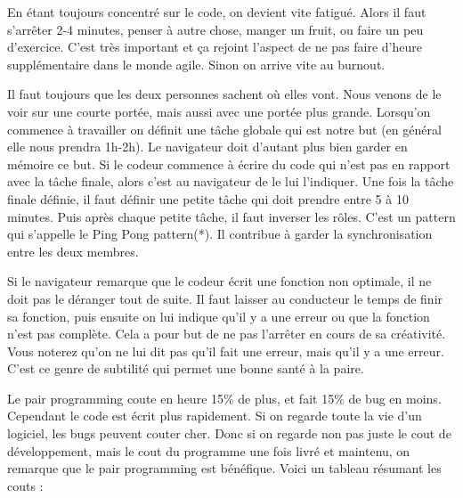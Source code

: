 \documentclass[journal, a4paper, frenchb]{IEEEtran}
\begin{document}
En étant toujours concentré sur le code, on devient vite fatigué. Alors il  faut s’arrêter 2-4 minutes, penser à autre chose, manger un fruit, ou faire un peu d’exercice. C’est très important et ça rejoint l’aspect de ne pas faire d’heure supplémentaire dans le monde agile. Sinon on arrive vite au burnout.

Il faut toujours que les deux personnes sachent où elles vont. Nous venons de le voir sur une courte portée, mais aussi avec une portée plus grande. Lorsqu’on commence à travailler on définit une tâche globale qui est notre but (en général elle nous prendra 1h-2h). Le navigateur doit d’autant plus bien garder en mémoire ce but. Si le codeur commence à écrire du code qui n’est pas en rapport avec la tâche finale, alors c’est au navigateur de le lui l’indiquer. Une fois la tâche finale définie, il faut définir une petite tâche qui doit prendre entre 5 à 10 minutes. Puis après chaque petite tâche, il faut inverser les rôles. C'est un pattern qui s'appelle le Ping Pong pattern(*). Il contribue à garder la synchronisation entre les deux membres. \cite{PPping}

Si le navigateur remarque que le codeur écrit une fonction non optimale, il ne doit pas le déranger tout de suite. Il faut laisser au conducteur le temps de finir sa fonction, puis ensuite on lui indique qu’il y a une erreur ou que la fonction n’est pas complète. Cela a pour but de ne pas l'arrêter en cours de sa créativité. Vous noterez qu'on ne lui dit pas qu'il fait une erreur, mais qu'il y a une erreur. C'est ce genre de subtilité qui permet une bonne santé à la paire.

Le pair programming coute en heure 15\% de plus, et fait 15\% de bug en moins\cite[p.~86]{PPLaurie}. Cependant le code est écrit plus rapidement. Si on regarde toute la vie d'un logiciel, les bugs peuvent couter cher. Donc si on regarde non pas juste le cout de développement, mais le cout du programme une fois livré et maintenu, on remarque que le pair programming est bénéfique. Voici un tableau résumant les couts :
\end{document}
